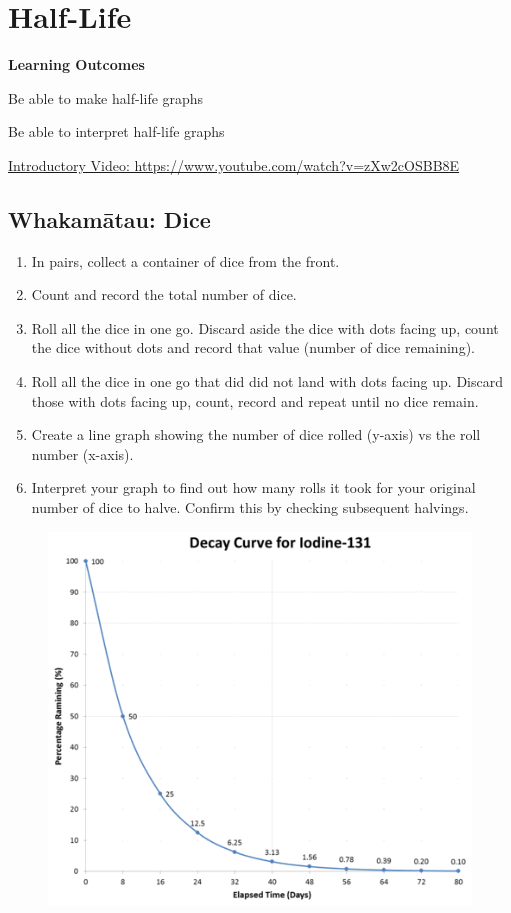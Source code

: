 \documentclass[12pt]{report}
\begin{document}
\newpage
\chapter{Half-Life}

\noindent\textbf{Learning Outcomes}
\begin{nwa}
	\item Be able to make half-life graphs
	\item Be able to interpret half-life graphs
\end{nwa}

\noindent\href{https://www.youtube.com/watch?v=zXw2cOSBB8E}{Introductory Video: https://www.youtube.com/watch?v=zXw2cOSBB8E}

\section{Whakamātau: Dice}
\begin{enumerate}
	\item In pairs, collect a container of dice from the front.
	\item Count and record the total number of dice.
	\item Roll all the dice in one go. Discard aside the dice with dots facing up, count the dice without dots and record that value (number of dice remaining).
	\item Roll all the dice in one go that did did not land with dots facing up. Discard those with dots facing up, count, record and repeat until no dice remain.
	\item Create a line graph showing the number of dice rolled (y-axis) vs the roll number (x-axis).
	\item Interpret your graph to find out how many rolls it took for your original number of dice to halve. Confirm this by checking subsequent halvings.
\end{enumerate}

\newpage
\begin{figure}
	\centering
	\includegraphics[width=0.9\linewidth]{iodine-131.png}
\end{figure}
\end{document}
